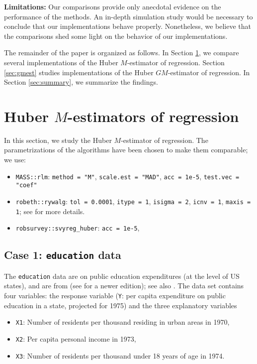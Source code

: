 \documentclass[a4paper]{scrartcl}
\begin{document}
\begin{leftbar}
\textbf{Limitations:} Our comparisons provide only anecdotal evidence on the performance of the methods. An in-depth simulation study would be necessary to conclude that our implementations behave properly. Nonetheless, we believe that the comparisons shed some light on the behavior of our implementations. 
\end{leftbar}

The remainder of the paper is organized as follows. In Section \ref{sec:mest}, we compare several implementations of the Huber $M$-estimator of regression. Section \ref{sec:gmest} studies  implementations of the Huber $GM$-estimator of regression. In Section \ref{sec:summary}, we summarize the findings. 

\section{Huber $M$-estimators of regression}\label{sec:mest}
In this section, we study the Huber $M$-estimator of regression. The parametrizations of the algorithms have been chosen to make them comparable; we use: 
\begin{itemize}
   \item \texttt{MASS::rlm}: \texttt{method = "M"}, \texttt{scale.est = "MAD"}, \texttt{acc = 1e-5}, \texttt{test.vec = "coef"}
   \item \texttt{robeth::rywalg}: \texttt{tol = 0.0001}, \texttt{itype = 1}, \texttt{isigma = 2}, \texttt{icnv = 1}, \texttt{maxis = 1}; see \cite{marazzi1993} for more details.	
   \item \texttt{robsurvey::svyreg\_huber}: \texttt{acc = 1e-5}, 
\end{itemize}

\subsection{Case 1: \texttt{education} data}\label{sec:education}
The \texttt{education} data are on public education expenditures (at the level of US states), and are from \cite{chatterjeeprice} (see \cite{chatterjeehadi} for a newer edition); see also \cite{rousseeuwleroy}. The data set contains four variables: the response variable (\texttt{Y}: per capita expenditure on public education in a state, projected for 1975) and the three explanatory variables
\begin{itemize}
   \item \texttt{X1}: Number of residents per thousand residing in urban areas in 1970,
   \item \texttt{X2}: Per capita personal income in 1973,
   \item \texttt{X3}: Number of residents per thousand under 18 years of age in 1974.
\end{itemize}
\end{document}
